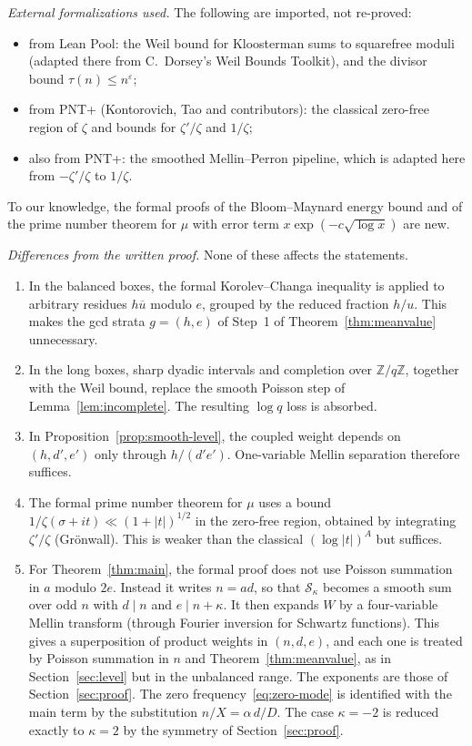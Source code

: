 \documentclass[11pt]{amsart}
\theoremstyle{definition}
\theoremstyle{remark}
\numberwithin{equation}{section}
\newcommand{\Z}{\mathbb Z}
\newcommand{\cS}{\mathcal S}
\newcommand{\eps}{\varepsilon}
\newcommand{\inv}[1]{\overline{#1}}
\begin{document}
\emph{External formalizations used.}  The following are imported, not
re-proved:
\begin{itemize}
\item from Lean Pool: the Weil bound for Kloosterman sums to squarefree
moduli (adapted there from C.~Dorsey's Weil Bounds Toolkit), and the
divisor bound $\tau(n)\le n^{\eps}$;
\item from PNT+ (Kontorovich, Tao and contributors): the classical
zero-free region of $\zeta$ and bounds for $\zeta'/\zeta$ and $1/\zeta$;
\item also from PNT+: the smoothed Mellin--Perron pipeline, which is adapted
here from $-\zeta'/\zeta$ to $1/\zeta$.
\end{itemize}
To our knowledge, the formal proofs of the Bloom--Maynard energy bound and
of the prime number theorem for $\mu$ with error term
$x\exp(-c\sqrt{\log x})$ are new.

\emph{Differences from the written proof.}  None of these affects the
statements.
\begin{enumerate}
\item In the balanced boxes, the formal Korolev--Changa inequality is
applied to arbitrary residues $h\inv u$ modulo $e$, grouped by the reduced
fraction $h/u$.  This makes the gcd strata $g=(h,e)$ of Step~1 of
Theorem~\ref{thm:meanvalue} unnecessary.
\item In the long boxes, sharp dyadic intervals and completion over
$\Z/q\Z$, together with the Weil bound, replace the smooth Poisson step of
Lemma~\ref{lem:incomplete}.  The resulting $\log q$ loss is absorbed.
\item In Proposition~\ref{prop:smooth-level}, the coupled weight depends on
$(h,d',e')$ only through $h/(d'e')$.  One-variable Mellin separation
therefore suffices.
\item The formal prime number theorem for $\mu$ uses a bound
$1/\zeta(\sigma+it)\ll(1+|t|)^{1/2}$ in the zero-free region, obtained by
integrating $\zeta'/\zeta$ (Gr\"onwall).  This is weaker than the classical
$(\log|t|)^A$ but suffices.
\item For Theorem~\ref{thm:main}, the formal proof does not use Poisson
summation in $a$ modulo $2e$.  Instead it writes $n=ad$, so that
$\cS_\kappa$ becomes a smooth sum over odd $n$ with $d\mid n$ and
$e\mid n+\kappa$.  It then expands $W$ by a four-variable Mellin transform
(through Fourier inversion for Schwartz functions).  This gives a superposition of
product weights in $(n,d,e)$, and each one is treated by Poisson summation
in $n$ and Theorem~\ref{thm:meanvalue}, as in
Section~\ref{sec:level} but in the unbalanced range.  The exponents are those
of Section~\ref{sec:proof}.  The zero frequency~\eqref{eq:zero-mode} is
identified with the main term by the substitution $n/X=\alpha\,d/D$.  The
case $\kappa=-2$ is reduced exactly to $\kappa=2$ by the symmetry of
Section~\ref{sec:proof}.
\end{enumerate}
\end{document}
